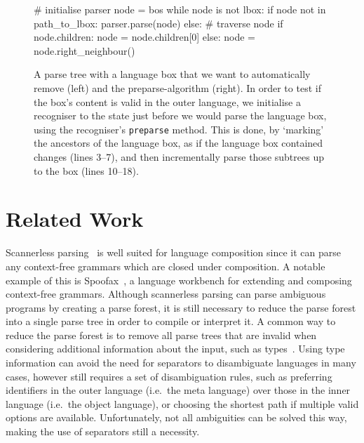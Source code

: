 \documentclass[sigplan,screen]{acmart}\settopmatter{printfolios=true,printccs=false,printacmref=false}
\begin{document}
\begin{figure}
\begin{minipage}{0.5\textwidth}
\begin{lstdefault}[basicstyle=\linespread{1.0}\footnotesize\ttfamily]
  # initialise parser
  node = bos
  while node is not lbox:
    if node not in path_to_lbox:
      parser.parse(node)
    else: # traverse node
      if node.children:
        node = node.children[0]
      else:
        node = node.right_neighbour()
\end{lstdefault}
\end{minipage}
\caption{A parse tree with a language box that we want to automatically remove (left)
and the preparse-algorithm (right). In
order to test if the box's content is valid in the outer language, we
initialise a recogniser to the state just before we would parse the language box,
using the recogniser's \texttt{preparse} method. This is done,
by `marking' the ancestors of the language box, as if the language box
contained changes (lines 3--7), and then incrementally parse those subtrees
up to the box (lines 10--18).}
\label{fig_preparse}
\end{figure}

\section{Related Work}
\label{autobox_related_work}


Scannerless parsing~\cite{visser97scannerless, vandenbrand02disambiguation} is well
suited for language composition since it can parse any context-free grammars
which are closed under composition. A notable example of this is
Spoofax~\cite{kats10spoofax}, a language workbench for extending and composing
context-free grammars.
Although scannerless parsing can parse ambiguous programs by creating a parse
forest, it is still necessary to reduce the parse forest into a single
parse tree in order to compile or interpret it. A common way to reduce the parse forest is to
remove all parse trees that are invalid when considering additional information
about the input, such as types~\cite{vinju05typedriven}. Using type information can avoid the
need for separators to disambiguate languages in many cases, however still
requires a set of disambiguation rules, such as preferring identifiers in the
outer language (i.e.~the meta language) over those in the inner language
(i.e.~the object language), or choosing the shortest path if multiple valid
options are available. Unfortunately, not all ambiguities can be solved this
way, making the use of separators still a necessity.
\end{document}
